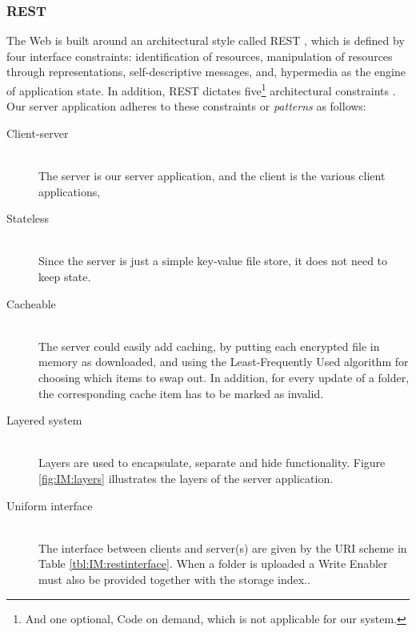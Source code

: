 \documentclass[pdftex,english,10pt,b5paper,twoside]{book}
\begin{document}
\subsubsection{\acs{REST}} The Web is built around an architectural style called
\ac{REST} \cite[ch. 5]{fielding}, which is defined by four interface
constraints: identification of resources, manipulation of resources through
representations, self-descriptive messages, and, hypermedia as the engine of
application state. In addition, \ac{REST} dictates five\footnote{And one
optional, Code on demand, which is not applicable for our system.} architectural
constraints \cite{fielding}. Our server application adheres to these
constraints or \emph{patterns} as follows:

\begin{description}
  \item[Client-server] \hfill \\
    The server is our server application, and the client is the various client
    applications,

  \item[Stateless] \hfill \\
    Since the server is just a simple key-value file store, it does
    not need to keep state.

  \item[Cacheable] \hfill \\
    The server could easily add caching, by putting each encrypted file in
    memory as downloaded, and using the Least-Frequently Used algorithm for
    choosing which items to swap out. In addition, for every update of a folder,
    the corresponding cache item has to be marked as invalid.

  \item[Layered system] \hfill \\
    Layers are used to encapsulate, separate and hide functionality.
    Figure \ref{fig:IM:layers} illustrates the layers of the server application.

  \item[Uniform interface] \hfill \\
    The interface between clients and server(s) are given by the URI scheme in
    Table \ref{tbl:IM:restinterface}. When a folder is uploaded a Write Enabler
    must also be provided together with the storage index..
\end{description}
\end{document}
